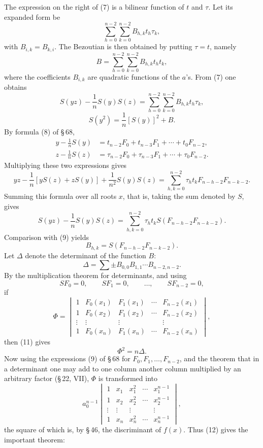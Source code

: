 \documentclass[11pt]{article}
\begin{document}
The expression on the right of (7) is a bilinear function of $t$ and $\tau$. Let its expanded form be
\[
 \sum_{h=0}^{n-2}\sum_{k=0}^{n-2}B_{h,k}t_h\tau_k,
\]
with $B_{i,k}=B_{k,i}$. The Bezoutian is then obtained by putting $\tau=t$, namely
\begin{equation}
 B=\sum_{h=0}^{n-2}\sum_{k=0}^{n-2}B_{h,k}t_ht_k,
\tag{8}
\end{equation}
where the coefficients $B_{i,k}$ are quadratic functions of the $a$'s. From (7) one obtains
\begin{equation}
 S(yz)-\frac1nS(y)S(z)=\sum_{h=0}^{n-2}\sum_{k=0}^{n-2}B_{h,k}t_h\tau_k,
\tag{9}
\end{equation}
\begin{equation}
 S(y^2)=\frac1n[S(y)]^2+B.
\tag{10}
\end{equation}
By formula (8) of \S\,68,
\[
\begin{aligned}
 y-\frac1nS(y)&=t_{n-2}F_0+t_{n-3}F_1+\cdots+t_0F_{n-2},\\
 z-\frac1nS(z)&=\tau_{n-2}F_0+\tau_{n-3}F_1+\cdots+\tau_0F_{n-2}.
\end{aligned}
\]
Multiplying these two expressions gives
\[
 yz-\frac1n[yS(z)+zS(y)]+\frac1{n^2}S(y)S(z)
 =\sum_{h,k=0}^{n-2}\tau_ht_kF_{n-h-2}F_{n-k-2}.
\]
Summing this formula over all roots $x$, that is, taking the sum denoted by $S$, gives
\[
 S(yz)-\frac1nS(y)S(z)=\sum_{h,k=0}^{n-2}\tau_ht_kS(F_{n-h-2}F_{n-k-2}).
\]
Comparison with (9) yields
\begin{equation}
 B_{h,k}=S(F_{n-h-2}F_{n-k-2}).
\tag{11}
\end{equation}
Let $\Delta$ denote the determinant of the function $B$:
\[
 \Delta=\sum \pm B_{0,0}B_{1,1}\cdots B_{n-2,n-2}.
\]
By the multiplication theorem for determinants, and using
\[
 SF_0=0,
 \qquad SF_1=0,
 \qquad\ldots,
 \qquad SF_{n-2}=0,
\]
if
\[
 \Phi=\begin{vmatrix}
 1&F_0(x_1)&F_1(x_1)&\cdots&F_{n-2}(x_1)\\
 1&F_0(x_2)&F_1(x_2)&\cdots&F_{n-2}(x_2)\\
 \vdots&\vdots&\vdots&&\vdots\\
 1&F_0(x_n)&F_1(x_n)&\cdots&F_{n-2}(x_n)
 \end{vmatrix},
\]
then (11) gives
\begin{equation}
 \Phi^2=n\Delta.
\tag{12}
\end{equation}
Now using the expressions (9) of \S\,68 for $F_0,F_1,\ldots,F_{n-2}$, and the theorem that in a determinant one may add to one column another column multiplied by an arbitrary factor (\S\,22, VII), $\Phi$ is transformed into
\[
 a_0^{n-1}
 \begin{vmatrix}
 1&x_1&x_1^2&\cdots&x_1^{n-1}\\
 1&x_2&x_2^2&\cdots&x_2^{n-1}\\
 \vdots&\vdots&\vdots&&\vdots\\
 1&x_n&x_n^2&\cdots&x_n^{n-1}
 \end{vmatrix},
\]
the square of which is, by \S\,46, the discriminant of $f(x)$. Thus (12) gives the important theorem:
\end{document}
